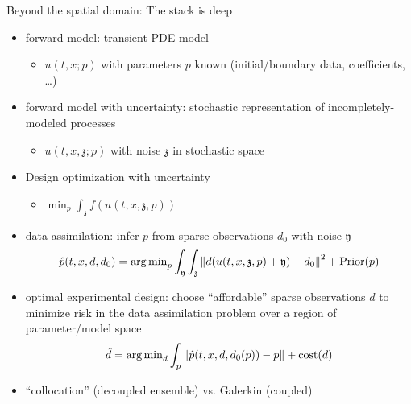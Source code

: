 \documentclass{beamer}
\begin{document}
\begin{frame}{Beyond the spatial domain: The stack is deep}
  \begin{itemize}
  \item forward model: transient PDE model
    \begin{itemize}
    \item $u(t,x; p)$ with parameters $p$ known (initial/boundary data, coefficients, \ldots)
    \end{itemize}
  \item forward model with uncertainty: stochastic representation of incompletely-modeled processes
    \begin{itemize}
    \item $u(t,x,\mathfrak z; p)$ with noise $\mathfrak z$ in stochastic space
    \end{itemize}
  \item Design optimization with uncertainty
    \begin{itemize}
    \item $\min_p \int_{\mathfrak z} f(u(t,x,\mathfrak z,p) ) $
    \end{itemize}
  \item data assimilation: infer $p$ from sparse observations $d_0$ with noise $\mathfrak y$
    \begin{equation*}
    \hat p(t,x,d,d_0) = \operatorname{arg\,min}_p \int_{\mathfrak y} \int_{\mathfrak z} \left\lVert d(u(t,x,\mathfrak z,p) + \mathfrak y) - d_0 \right\rVert^2 + \mathrm{Prior}(p)
  \end{equation*}
  \item optimal experimental design: choose ``affordable'' sparse observations $d$ to minimize risk in the data assimilation problem over a region of parameter/model space
    \begin{equation*}
      \hat d = \operatorname{arg\,min}_d \int_p \left\lVert \hat p(t,x,d,d_0(p)) - p \right\rVert + \mathrm{cost}(d)
    \end{equation*}
  \item ``collocation'' (decoupled ensemble) vs. Galerkin (coupled)
  \end{itemize}
\end{frame}
\end{document}
